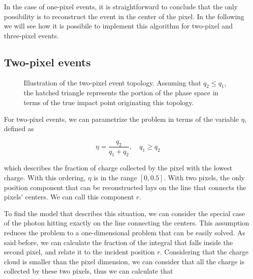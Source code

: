 In the case of one-pixel events, it is straightforward to conclude that the only possibility is to reconstruct the event in the center of the pixel. In the following we will see how it is possibile to implement this algorithm for two-pixel and three-pixel events.

\subsection{Two-pixel events}

\begin{figure}[htbp]
    \centering
    \caption{Illustration of the two-pixel event topology. Assuming that  $q_2 \leq q_1$, 
    the hatched triangle represents the portion of the phase space in terms of the 
    true impact point originating this topology.}
    \label{fig:two_pixel_event}
\end{figure}

For two-pixel events, we can parametrize the problem in terms of the variable $\eta$, defined as

\begin{equation}
\eta = \frac{q_2}{q_1 + q_2}, \quad q_1 \geq q_2
\end{equation}

which describes the fraction of charge collected by the pixel with the lowest charge. With this ordering, $\eta$ is in the range $[0, 0.5]$. With two pixels, the only position component that can be reconstructed lays on the line that connects the pixels' centers. We can call this component $r$.

To find the model that describes this situation, we can consider the special case of the photon hitting exactly on the line connecting the centers. This assumption reduces the problem to a one-dimensional problem that can be easily solved. As said before, we can calculate the fraction of the integral that falls inside the second pixel, and relate it to the incident position $r$. Considering that the charge cloud is smaller than the pixel dimension, we can consider that all the charge is collected by these two pixels, thus we can calculate that

